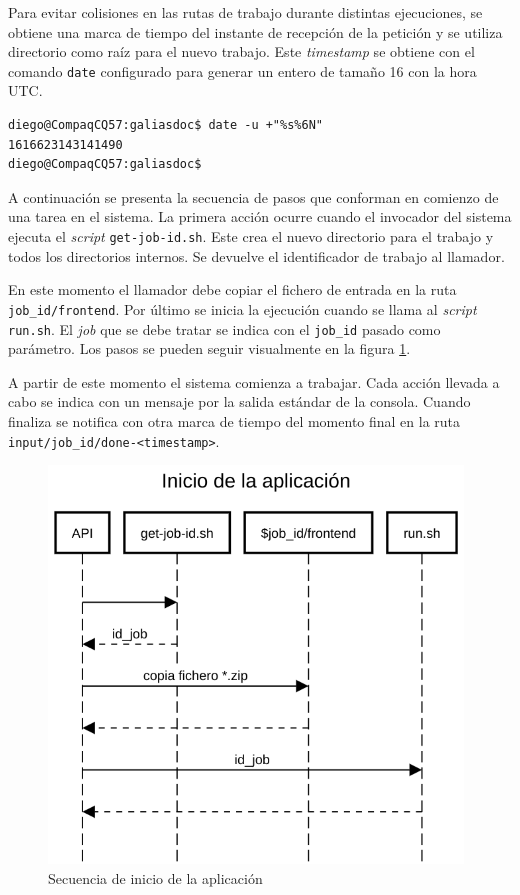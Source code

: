 Para evitar colisiones en las rutas de trabajo durante distintas ejecuciones, se obtiene una marca de tiempo del instante de recepción de la petición y se utiliza directorio como raíz para el nuevo trabajo. Este \emph{timestamp} se obtiene con el comando \verb|date| configurado para generar un entero de tamaño 16 con la hora UTC.

\begin{verbatim}
diego@CompaqCQ57:galiasdoc$ date -u +"%s%6N"
1616623143141490
diego@CompaqCQ57:galiasdoc$
\end{verbatim}

A continuación se presenta la secuencia de pasos que conforman en comienzo de una tarea en el sistema. La primera acción ocurre cuando el invocador del sistema ejecuta el \emph{script} \verb|get-job-id.sh|. Este crea el nuevo directorio para el trabajo y todos los directorios internos. Se devuelve el identificador de trabajo al llamador.

En este momento el llamador debe copiar el fichero de entrada en la ruta \verb|job_id/frontend|. Por último se inicia la ejecución cuando se llama al \emph{script} \verb|run.sh|. El \emph{job} que se debe tratar se indica con el \verb|job_id| pasado como parámetro. Los pasos se pueden seguir visualmente en la figura \ref{fig:inicio-aplicacion}.

A partir de este momento el sistema comienza a trabajar. Cada acción llevada a cabo se indica con un mensaje por la salida estándar de la consola. Cuando finaliza se notifica con otra marca de tiempo del momento final en la ruta \verb|input/job_id/done-<timestamp>|.

\begin{figure}[hp!]
  \centering
  \includegraphics[width=11cm]{imaxes/inicio-aplicacion.png}
  \caption{Secuencia de inicio de la aplicación}
  \label{fig:inicio-aplicacion}
\end{figure}

